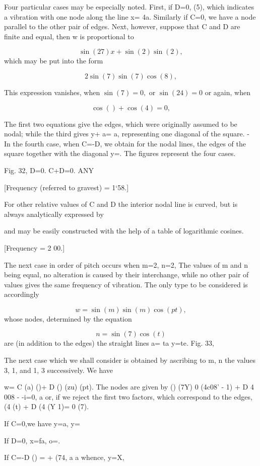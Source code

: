Four particular cases may be especially noted. First, if D=0, (5),
which indicates a vibration with one node along the line x= 4a.
Similarly if C=0, we have a node parallel to the other pair of edges.
Next, however, suppose that C and D are finite and equal, then w is
proportional to

\[\sin(27)  x  + \sin(2) \sin(2),\]
which may be put into the form

\[2 \sin(7) \sin(7) \cos(8) ,\]

This expression vanishes, when \(\sin(7) =0,\) or \(\sin(24) =0\) or
again, when

\[\cos()+ \cos(4) =0,\]

The first two equations give the edges, which were originally
assumed to be nodal; while the third gives y+ a= a, representing one
diagonal of the square. - In the fourth case, when C=-D, we obtain for
the nodal lines, the edges of the square together with the diagonal y=.
The figures represent the four cases.

Fig. 32, D=0. C+D=0.
ANY

[Frequency (referred to gravest) = 1‘58.]

For other relative values of C and D the interior nodal line is curved,
but is always analytically expressed by

and may be easily constructed with the help of a table of logarithmic
cosines.

[Frequency = 2 00.]


The next case in order of pitch occurs when m=2, n=2, The values of m
and n being equal, no alteration is caused by their interchange, while
no other pair of values gives the same frequency of vibration. The only
type to be considered is accordingly

\[w = \sin(m) \sin(m) \cos(pt),\]
whose nodes, determined by the equation

\[n = \sin(7) \cos(t)\]
are (in addition to the edges) the straight lines a= ta y=te. Fig. 33,

The next case which we shall consider is obtained by ascribing to m, n
the values 3, 1, and 1, 3 successively. We have

w= C (a) ()+ D () (zu) (pt). The nodes are given by () (7Y) 0 (4c08' -
1) + D 4 008 - -i=0, a or, if we reject the first two factors, which
correspond to the edges, (4 (t) + D (4 (Y 1)= 0 (7).

If C=0,we have y=a, y=

If D=0, x=fa, o=.

If C=-D () = + (74, a a whence, y=X,


